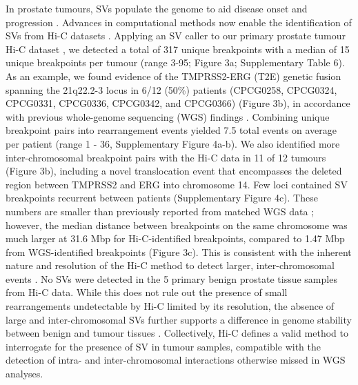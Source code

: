In prostate tumours, SVs populate the genome to aid disease onset and progression \cite{fraserGenomicHallmarksLocalized2017,quigleyGenomicHallmarksStructural2018}.
Advances in computational methods now enable the identification of SVs from Hi-C datasets \cite{dixonIntegrativeDetectionAnalysis2018,hoStructuralVariationSequencing2019}.
Applying an SV caller to our primary prostate tumour Hi-C dataset \cite{dixonIntegrativeDetectionAnalysis2018}, we detected a total of 317 unique breakpoints with a median of 15 unique breakpoints per tumour (range 3-95; Figure 3a; Supplementary Table 6).
As an example, we found evidence of the TMPRSS2-ERG (T2E) genetic fusion spanning the 21q22.2-3 locus in 6/12 (50\%) patients (CPCG0258, CPCG0324, CPCG0331, CPCG0336, CPCG0342, and CPCG0366) (Figure 3b), in accordance with previous whole-genome sequencing (WGS) findings \cite{fraserGenomicHallmarksLocalized2017}.
Combining unique breakpoint pairs into rearrangement events yielded 7.5 total events on average per patient (range 1 - 36, Supplementary Figure 4a-b).
We also identified more inter-chromosomal breakpoint pairs with the Hi-C data in 11 of 12 tumours (Figure 3b), including a novel translocation event that encompasses the deleted region between TMPRSS2 and ERG into chromosome 14.
Few loci contained SV breakpoints recurrent between patients (Supplementary Figure 4c).
These numbers are smaller than previously reported from matched WGS data \cite{fraserGenomicHallmarksLocalized2017}; however, the median distance between breakpoints on the same chromosome was much larger at 31.6 Mbp for Hi-C-identified breakpoints, compared to 1.47 Mbp from WGS-identified breakpoints (Figure 3c).
This is consistent with the inherent nature and resolution of the Hi-C method to detect larger, inter-chromosomal events \cite{dixonIntegrativeDetectionAnalysis2018}.
No SVs were detected in the 5 primary benign prostate tissue samples from Hi-C data.
While this does not rule out the presence of small rearrangements undetectable by Hi-C limited by its resolution, the absence of large and inter-chromosomal SVs further supports a difference in genome stability between benign and tumour tissues \cite{fraserGenomicHallmarksLocalized2017,bergerGenomicComplexityPrimary2011,bacaPunctuatedEvolutionProstate2013,mazrooeiCistromePartitioningReveals2019}.
Collectively, Hi-C defines a valid method to interrogate for the presence of SV in tumour samples, compatible with the detection of intra- and inter-chromosomal interactions otherwise missed in WGS analyses.


